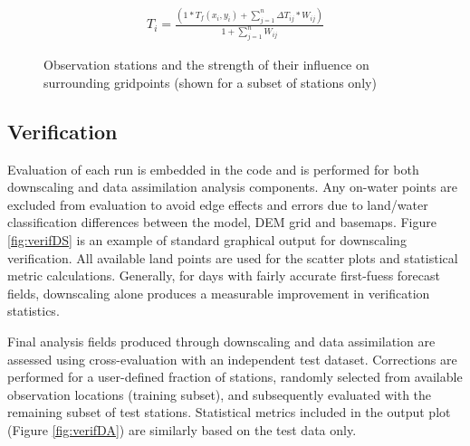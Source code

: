 \documentclass{article}
\begin{document}
\begin{eqnarray}
T_i = \frac{(1 * T_f(x_i,y_i) + \sum\limits_{j=1}^n \Delta T_{ij} * W_{ij})}{1 + \sum\limits_{j=1}^n W_{ij}}
\end{eqnarray}

\begin{landscape}
\pagestyle{empty}

\begin{figure}
\caption{Observation stations and the strength of their influence on surrounding gridpoints	 (shown for a subset of stations only)}\label{fig:MD} 
\end{figure}

\end{landscape}
\restoregeometry
\pagestyle{plain}


\FloatBarrier

\subsection{Verification}
Evaluation of each run is embedded in the code and is performed for both downscaling and data assimilation analysis components. Any on-water points are excluded from evaluation to avoid edge effects and errors due to land/water classification differences between the model, DEM grid and basemaps. Figure \ref{fig:verifDS} is an example of standard graphical output for downscaling verification. All available land points are used for the scatter plots and statistical metric calculations. Generally, for days with fairly accurate first-fuess forecast fields, downscaling alone produces a measurable improvement in verification statistics. 

Final analysis fields produced through downscaling and data assimilation are assessed using cross-evaluation with an independent test dataset. Corrections are performed for a user-defined fraction of stations, randomly selected from available observation locations (training subset), and subsequently evaluated with the remaining subset of test stations. Statistical metrics included in the output plot (Figure \ref{fig:verifDA}) are similarly based on the test data only. 

\newpage


\end{document}
